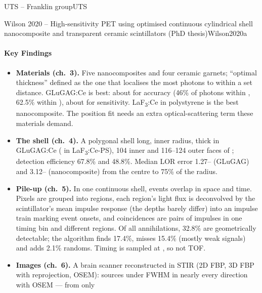 \begin{programnote}{UTS -- Franklin group}{UTS}
\begin{papernote}{Wilson 2020 -- High-sensitivity PET using optimised continuous cylindrical shell nanocomposite and transparent ceramic scintillators (PhD thesis)}{Wilson2020a}
\paragraph{Key Findings}
\begin{itemize}
	\item \textbf{Materials (ch.\ 3).} Five nanocomposites and four ceramic
		garnets; ``optimal thickness'' defined as the one that localises the
		most photons to within a set distance. GLuGAG:Ce is best: about
		 for accuracy (46\% of photons within , 62.5\% within
		), about  for sensitivity. LaF\textsubscript{3}:Ce in
		polystyrene is the best nanocomposite. The position fit needs an extra
		optical-scattering term these materials demand.
	\item \textbf{The shell (ch.\ 4).} A polygonal shell  long,
		 inner radius,  thick in GLuGAG:Ce ( in
		LaF\textsubscript{3}:Ce-PS), 104 inner and 116--124 outer faces of
		; detection efficiency 67.8\% and 48.8\%. Median LOR error
		1.27-- (GLuGAG) and 3.12-- (nanocomposite) from
		the centre to 75\% of the radius.
	\item \textbf{Pile-up (ch.\ 5).} In one continuous shell, events
		overlap in space and time. Pixels are grouped into regions, each
		region's light flux is deconvolved by the scintillator's
		mean impulse response (the depths barely differ) into an impulse train marking event
		onsets, and coincidences are pairs of impulses in one timing bin and
		different regions. Of all annihilations, 32.8\% are geometrically
		detectable; the algorithm finds 17.4\%, misses 15.4\% (mostly weak
		signals) and adds 2.1\% randoms. Timing is sampled at , so
		not TOF.
	\item \textbf{Images (ch.\ 6).} A brain scanner reconstructed in STIR
		(2D FBP, 3D FBP with reprojection, OSEM):  sources under
		 FWHM in nearly every direction with OSEM --- from only

\end{itemize}
\end{papernote}
\end{programnote}

